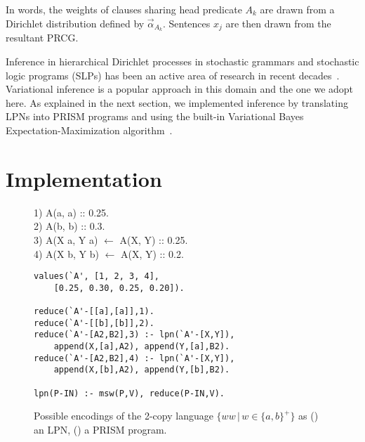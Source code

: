 \documentclass[10pt, twocolumn]{article}
\begin{document}
In words, the weights of clauses sharing head predicate $A_k$ are drawn from a Dirichlet distribution defined by $\vec{\alpha}_{A_k}$. Sentences $x_j$ are then drawn from the resultant PRCG.

Inference in hierarchical Dirichlet processes in stochastic grammars
and stochastic logic programs (SLPs) has been an active area of
research in recent decades~\cite{DBLP:conf/emnlp/LiangPJK07,
  goldwater2006contextual, johnson2006adaptor, cussens2001parameter}.
Variational inference is a popular approach in this domain and the one
we adopt here. As explained in the next section, we implemented
inference by translating LPNs into PRISM programs and using the
built-in Variational Bayes Expectation-Maximization
algorithm~\cite{sato2008variational}. 

\section{Implementation \label{sec:implementation}}


\begin{figure}[t]
	\centering
	\begin{minipage}[b]{0.8\linewidth}
1) A(a, a) :: 0.25. \\
2) A(b, b) :: 0.3. \\
3) A(X a, Y a) $\leftarrow$ A(X, Y) :: 0.25. \\
4) A(X b, Y b) $\leftarrow$ A(X, Y) :: 0.2.
		\subcaption{}
		\label{fig:grammar}
	\end{minipage}
	\begin{minipage}[b]{0.8\linewidth}
        \fontsize{9}{10.5}\selectfont\ttfamily
		\begin{verbatim}
values(`A', [1, 2, 3, 4],
    [0.25, 0.30, 0.25, 0.20]).

reduce(`A'-[[a],[a]],1).
reduce(`A'-[[b],[b]],2).
reduce(`A'-[A2,B2],3) :- lpn(`A'-[X,Y]),
    append(X,[a],A2), append(Y,[a],B2).
reduce(`A'-[A2,B2],4) :- lpn(`A'-[X,Y]),
    append(X,[b],A2), append(Y,[b],B2).

lpn(P-IN) :- msw(P,V), reduce(P-IN,V).
		\end{verbatim}
		\subcaption{}
		\label{fig:prism}
	\end{minipage}
	\caption{Possible encodings of the 2-copy language $\{ww\,|\, w \in \{a,b\}^+\}$ as () an LPN, () a PRISM program.}
	\label{fig:copy}
\end{figure}
\end{document}
